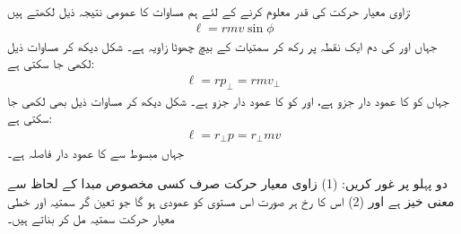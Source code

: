  \quad
     زاوی معیار حرکت   کی قدر  معلوم  کرنے کے لئے ہم   مساوات  کا عمومی نتیجہ  ذیل لکھتے ہیں:
 \begin{align}\label{مساوات_لڑھکاو_زاوی_قدر_معیار_حرکت}
 \ell=rmv\sin\phi
 \end{align}
 جہاں  اور   کی دم ایک نقطہ پر رکھ کر  سمتیات کے بیچ چھوٹا زاویہ  ہے۔ شکل  دیکھ کر مساوات  ذیل لکھی جا سکتی ہے:
 \begin{align}
 \ell=rp_{\perp}=rmv_{\perp}
 \end{align}
 جہاں  کو   کا عمود دار  جزو  ہے، اور   کو   کا عمود دار  جزو  ہے۔ شکل  دیکھ کر مساوات  ذیل بھی لکھی جا سکتی ہے:
 \begin{align}
 \ell=r_{\perp}p=r_{\perp}mv
 \end{align}
 جہاں مبسوط     سے  کا  عمود دار فاصلہ  ہے۔
 
 \quad
 دو  پہلو پر غور کریں: (1)  زاوی معیار حرکت صرف  کسی مخصوص مبدا کے لحاظ سے معنی خیز ہے اور (2)  اس کا رخ ہر صورت اس مستوی کو عمودی ہو گا جو   تعین گر سمتیہ  اور  خطی معیار حرکت  سمتیہ   مل کر بناتے ہیں۔
 
 
